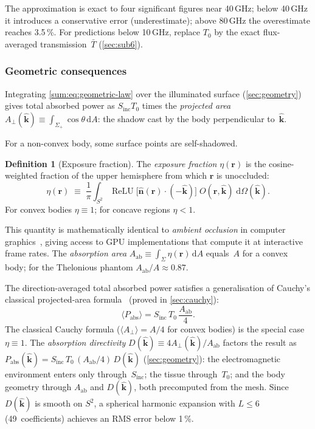 \documentclass[11pt,a4paper]{article}
\theoremstyle{definition}      %
\newtheorem{definition}[definition]{Definition}
\newcommand{\khat}{\hat{\bm{k}}}
\newcommand{\nhat}{\hat{\bm{n}}}
\newcommand{\rr}{\mathbf{r}}
\newcommand{\Sinc}{S_{\mathrm{inc}}}
\newcommand{\Aab}{A_{\mathrm{ab}}}
\newcommand{\Aperp}{A_{\perp}}
\DeclareMathOperator{\ReLU}{ReLU}
\newcommand{\Tbar}{\bar{T}}
\newcommand{\diff}{\mathrm{d}}        %
\begin{document}
The approximation is exact to four significant figures near 40\,GHz;
below 40\,GHz it introduces a conservative error (underestimate);
above 80\,GHz the overestimate reaches 3.5\,\%.
For predictions below 10\,GHz, replace $T_0$ by the exact
flux-averaged transmission~$\Tbar$ (\cref{sec:sub6}).

\subsubsection*{Geometric consequences}

Integrating \cref{sum:eq:geometric-law} over the illuminated surface
(\cref{sec:geometry}) gives total absorbed power as $\Sinc T_0$ times
the \emph{projected area}
$\Aperp(\khat)\equiv\int_{\Sigma_+}\cos\theta\,\diff A$: the shadow cast
by the body perpendicular to~$\khat$.

For a non-convex body, some surface points are self-shadowed.

\begin{definition}[Exposure fraction]\label{sum:def:eta}
The \emph{exposure fraction} $\eta(\rr)$ is the cosine-weighted fraction
of the upper hemisphere from which $\rr$ is unoccluded:
\begin{equation}\label{sum:eq:eta-def}
  \eta(\rr) \;\equiv\; \frac{1}{\pi}\int_{S^2}
  \ReLU\!\bigl[\nhat(\rr)\cdot(-\khat)\bigr]\;
  O(\rr,\khat)\;\diff\Omega(\khat).
\end{equation}
For convex bodies $\eta\equiv1$; for concave regions $\eta<1$.
\end{definition}

This quantity is mathematically identical to \emph{ambient occlusion} in
computer graphics~\cite{Zhukov1998}, giving access to GPU implementations
that compute it at interactive frame rates.
The \emph{absorption area} $\Aab\equiv\int_\Sigma\eta(\rr)\,\diff A$
equals~$A$ for a convex body; for the Thelonious phantom
$\Aab/A\approx0.87$.

The direction-averaged total absorbed power satisfies a generalisation
of Cauchy's classical projected-area formula~\cite{Cauchy1841}
(proved in \cref{sec:cauchy}):
\begin{equation}\label{sum:eq:gen-cauchy}
  \boxed{\langle P_{\mathrm{abs}}\rangle
    = \Sinc\,T_0\,\frac{\Aab}{4}.}
\end{equation}
The classical Cauchy formula ($\langle\Aperp\rangle=A/4$ for convex
bodies) is the special case $\eta\equiv1$.
The \emph{absorption directivity} $D(\khat)\equiv4\Aperp(\khat)/\Aab$
factors the result as $P_{\mathrm{abs}}(\khat)=\Sinc\,T_0\,(\Aab/4)\,D(\khat)$
(\cref{sec:geometry}): the electromagnetic environment enters only
through~$\Sinc$; the tissue through~$T_0$; and the body geometry
through $\Aab$ and $D(\khat)$, both precomputed from the mesh.
Since $D(\khat)$ is smooth on $S^2$, a spherical harmonic expansion
with $L\le6$ (49~coefficients) achieves an RMS error below 1\,\%.
\end{document}
